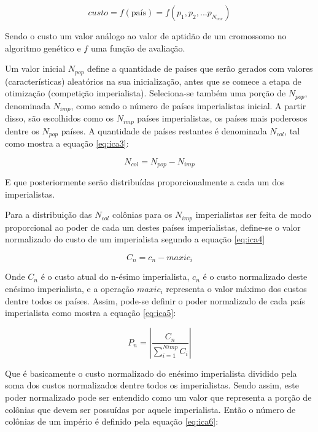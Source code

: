 \begin{equation}
\label{eq:ica2}
custo = f (\text{país}) = f (p_{1},p_{2},...p_{N_{var}})
\end{equation}

Sendo o custo um valor análogo ao valor de aptidão de um cromossomo no algoritmo genético e \(f\) uma função de avaliação.

Um valor inicial \(N_{pop}\) define a quantidade de países que serão gerados com valores (características) aleatórios na sua inicialização, antes que se comece a etapa de otimização (competição imperialista). Seleciona-se também uma porção de \(N_{pop}\), denominada \(N_{imp}\), como sendo o número de países imperialistas inicial. A partir disso, são escolhidos como os \(N_{imp}\) países imperialistas, os países mais poderosos dentre os \(N_{pop}\) países. A quantidade de países restantes é denominada \(N_{col}\), tal como mostra a equação \ref{eq:ica3}: 

\begin{equation}
\label{eq:ica3}
N_{col} = N_{pop} - N_{imp} 
\end{equation}

E que posteriormente serão distribuídas proporcionalmente a cada um dos imperialistas.

Para a distribuição  das \(N_{col}\) colônias para os \(N_{imp} \) imperialistas ser feita de modo proporcional ao poder de cada um destes países imperialistas, define-se o valor normalizado do custo de um imperialista segundo a equação \ref{eq:ica4}

\begin{equation}
\label{eq:ica4}
C_{n} =  c_{n} - maxi{c_{i}}
\end{equation}

Onde \(C_{n}\) é o custo atual do n-ésimo imperialista, \(c_{n}\) é o custo normalizado deste enésimo imperialista, e a operação \(maxi{c_{i}}\) representa o valor máximo dos custos dentre todos os países. Assim, pode-se definir o poder normalizado de cada país imperialista como mostra a equação \ref{eq:ica5}:

\begin{equation}
\label{eq:ica5}
P_{n} = \left| \frac{C_{n}}{\sum_{i=1}^{Nimp}C_{i}}\right| 
\end{equation}

Que é basicamente o custo normalizado do enésimo imperialista dividido pela soma dos custos normalizados dentre todos os imperialistas. Sendo assim, este poder normalizado pode ser entendido como um valor que representa a porção de colônias que devem ser possuídas por aquele imperialista. Então o número de colônias de um império é definido pela equação \ref{eq:ica6}:


